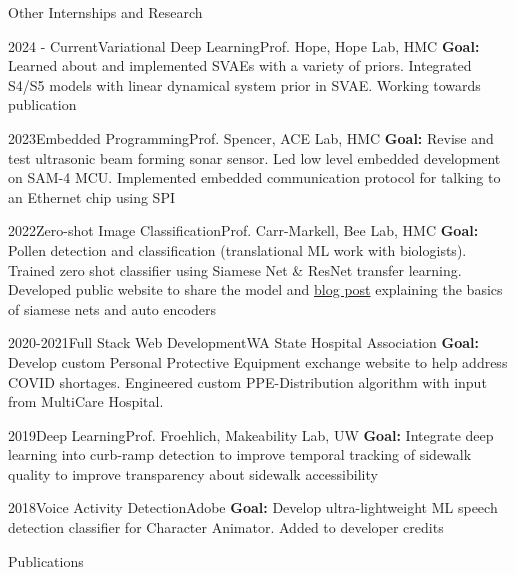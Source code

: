 \documentclass[]{mcdowellcv}
\begin{document}
\begin{cvsection}{Other Internships and Research}
	\begin{cvsubsection}{2024 - Current}{Variational Deep Learning}{Prof. Hope, Hope Lab, HMC}
		\textbf{Goal:} Learned about and implemented SVAEs with a variety of priors. Integrated S4/S5 models with linear dynamical system prior in SVAE. Working towards publication
	\end{cvsubsection}
	\begin{cvsubsection}{2023}{Embedded Programming}{Prof. Spencer, ACE Lab, HMC}
		\textbf{Goal:}  Revise and test ultrasonic beam forming sonar sensor. Led low level embedded development on SAM-4 MCU. Implemented embedded
		communication protocol for talking to an Ethernet chip using SPI
	\end{cvsubsection}
	\begin{cvsubsection}{2022}{Zero-shot Image Classification}{Prof. Carr-Markell, Bee Lab, HMC}
		\textbf{Goal:} Pollen detection and classification (translational ML work with biologists). Trained zero shot classifier using Siamese Net \& ResNet transfer learning. Developed public website to share the model and \href{https://hmcbee.blogspot.com/2022/12/blue-bees-twin-neural-networks-and-more.html}{blog post} explaining the basics of siamese nets and auto encoders
	\end{cvsubsection}
	\begin{cvsubsection}{2020-2021}{Full Stack Web Development}{WA State Hospital Association}
		\textbf{Goal:} Develop custom Personal Protective Equipment exchange website to help address COVID shortages. Engineered custom PPE-Distribution algorithm with input from  MultiCare Hospital.
	\end{cvsubsection}
	\begin{cvsubsection}{2019}{Deep Learning}{Prof. Froehlich, Makeability Lab, UW}
		\textbf{Goal:} Integrate deep learning into curb-ramp detection to improve temporal tracking of sidewalk quality to improve transparency about sidewalk accessibility
	\end{cvsubsection}

	\begin{cvsubsection}{2018}{Voice Activity Detection}{Adobe}
		\textbf{Goal:} Develop ultra-lightweight ML speech detection classifier for Character Animator. Added to developer credits
	\end{cvsubsection}
\end{cvsection}
\newpage
\begin{cvsection}{Publications}

	

\end{cvsection}
\end{document}
